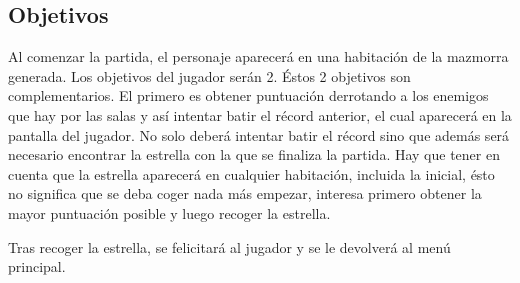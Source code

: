 \subsection{Objetivos}

Al comenzar la partida, el personaje aparecerá en una habitación de la mazmorra generada. Los objetivos del jugador serán 2. Éstos 2 objetivos son complementarios. El primero es obtener puntuación derrotando a los enemigos que hay por las salas y así intentar batir el récord anterior, el cual aparecerá en la pantalla del jugador. No solo deberá intentar batir el récord sino que además será necesario encontrar la estrella con la que se finaliza la partida. Hay que tener en cuenta que la estrella aparecerá en cualquier habitación, incluida la inicial, ésto no significa que se deba coger nada más empezar, interesa primero obtener la mayor puntuación posible y luego recoger la estrella.

Tras recoger la estrella, se felicitará al jugador y se le devolverá al menú principal.